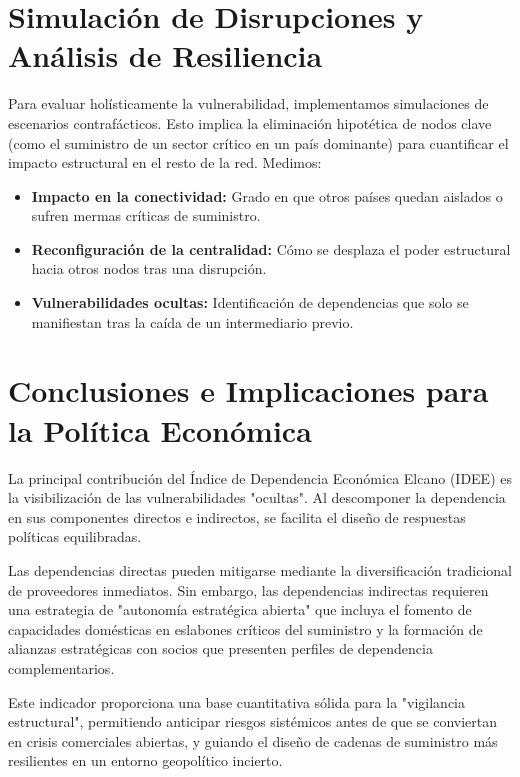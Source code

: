 \documentclass[final,1p,times,authoryear]{elsarticle}
\begin{document}
\section{Simulación de Disrupciones y Análisis de Resiliencia}



Para evaluar holísticamente la vulnerabilidad, implementamos simulaciones de escenarios contrafácticos. Esto implica la eliminación hipotética de nodos clave (como el suministro de un sector crítico en un país dominante) para cuantificar el impacto estructural en el resto de la red. Medimos:
\begin{itemize}
    \item \textbf{Impacto en la conectividad:} Grado en que otros países quedan aislados o sufren mermas críticas de suministro.
    \item \textbf{Reconfiguración de la centralidad:} Cómo se desplaza el poder estructural hacia otros nodos tras una disrupción.
    \item \textbf{Vulnerabilidades ocultas:} Identificación de dependencias que solo se manifiestan tras la caída de un intermediario previo.
\end{itemize}

\section{Conclusiones e Implicaciones para la Política Económica}

La principal contribución del Índice de Dependencia Económica Elcano (IDEE) es la visibilización de las vulnerabilidades "ocultas". Al descomponer la dependencia en sus componentes directos e indirectos, se facilita el diseño de respuestas políticas equilibradas.

Las dependencias directas pueden mitigarse mediante la diversificación tradicional de proveedores inmediatos. Sin embargo, las dependencias indirectas requieren una estrategia de "autonomía estratégica abierta" que incluya el fomento de capacidades domésticas en eslabones críticos del suministro y la formación de alianzas estratégicas con socios que presenten perfiles de dependencia complementarios.

Este indicador proporciona una base cuantitativa sólida para la "vigilancia estructural", permitiendo anticipar riesgos sistémicos antes de que se conviertan en crisis comerciales abiertas, y guiando el diseño de cadenas de suministro más resilientes en un entorno geopolítico incierto.



\end{document}
